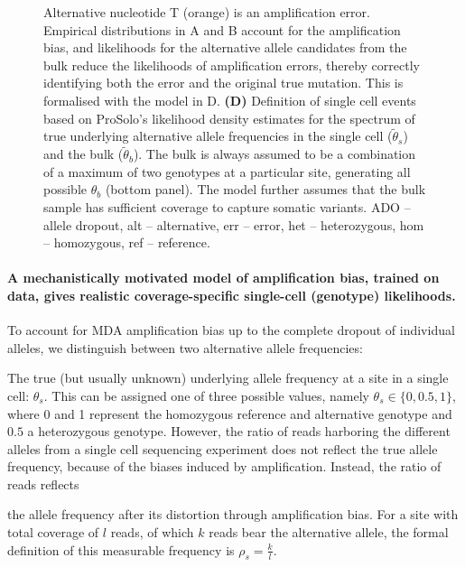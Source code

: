 \documentclass[12pt,inline]{wlscirep}
\begin{document}
\begin{figure}[!tpb]
{   Alternative nucleotide T (orange) is an amplification error.
   Empirical distributions in A and B account for the  amplification bias, and likelihoods for the alternative allele candidates from the bulk reduce the likelihoods of amplification errors, thereby correctly identifying both the error and the original true mutation.
   This is formalised with the model in D.
   \textbf{(D)} Definition of single cell events based on ProSolo's likelihood density estimates for the spectrum of true underlying alternative allele frequencies in the single cell ($\tilde{\theta}_s$) and the bulk ($\tilde{\theta}_b$).
   The bulk is always assumed to be a combination of a maximum of two genotypes at a particular site, generating all possible $\theta_b$ (bottom panel).
   The model further assumes that the bulk sample has sufficient coverage to capture somatic variants.\small\newline
   ADO -- allele dropout, alt -- alternative, err -- error, het -- heterozygous, hom -- homozygous, ref -- reference.}
  \label{fig:prosolo_alt-calling}
\end{figure}

\paragraph{A mechanistically motivated model of amplification bias, trained on data, gives realistic coverage-specific single-cell (genotype) likelihoods.}
To account for MDA amplification bias up to the complete dropout of individual alleles, we distinguish between two alternative allele frequencies:
\begin{enumerate*}[label={(\roman*)}]
  \item The true (but usually unknown) underlying allele frequency at a site in a single cell: $\theta_s$.
   This can be assigned one of three possible values, namely $\theta_s\in\{0,0.5,1\}$, where 0 and 1 represent the homozygous reference and alternative genotype and $0.5$ a heterozygous genotype.
   However, the ratio of reads harboring the different alleles from a single cell sequencing experiment does not reflect the true allele frequency, because of the biases induced by amplification. 
  Instead, the ratio of reads reflects
  \item the allele frequency after its distortion through amplification bias.
   For a site with total coverage of $l$ reads, of which $k$ reads bear the alternative allele, the formal definition of this measurable frequency is $\rho_s=\frac{k}{l}$.
\end{enumerate*}
\end{document}
